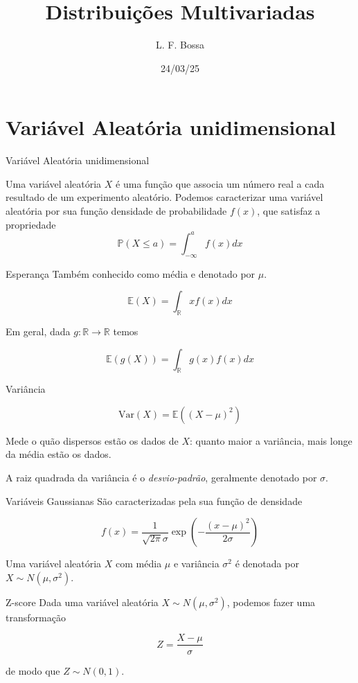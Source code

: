 \documentclass[
  ignorenonframetext,
  aspectratio=169,
]{beamer}
\title{Distribuições Multivariadas}
\author{L. F. Bossa}
\date{24/03/25}
\institute{UFSC}
\newcommand{\PP}{\mathbb{P}}
\newcommand{\RR}{\mathbb{R}}
\begin{document}
\frame{\titlepage}

\section{Variável Aleatória unidimensional}

\begin{frame}{Variável Aleatória unidimensional}

Uma variável aleatória $X$ é uma função que associa um número real a cada resultado de um experimento aleatório.
Podemos caracterizar uma variável aleatória por sua função densidade de probabilidade $f(x)$, que satisfaz a propriedade
\[\PP(X \le a) = \int_{-\infty}^{a} f(x) dx \] 
\end{frame}

\begin{frame}{Esperança}
Também conhecido como média e denotado por \(\mu\).

\[\mathbb{E}(X) = \int_{\RR} xf(x) dx\]
\end{frame}

\begin{frame}
Em geral, dada \(g: \RR\to \RR\) temos

\[\mathbb{E}(g(X)) = \int_{\RR} g(x)f(x) dx\]
\end{frame}

\begin{frame}{Variância}

\[\text{Var}(X) = \mathbb{E}( (X - \mu)^2)\]

Mede o quão dispersos estão os dados de \(X\): quanto maior a variância,
mais longe da média estão os dados.

A raiz quadrada da variância é o \emph{desvio-padrão}, geralmente denotado por
\(\sigma\).
\end{frame}

\begin{frame}{Variáveis Gaussianas}
São caracterizadas pela sua função de densidade

\[f(x) = \frac{1}{\sqrt{2\pi}\sigma}\exp\left(-\frac{(x-\mu)^2}{2\sigma}\right)\]

Uma variável aleatória \(X\) com média \(\mu\) e variância \(\sigma^2\)
é denotada por \(X\sim N(\mu,\sigma^2)\).
\end{frame}

\begin{frame}{Z-score}
Dada uma variável aleatória \(X\sim N(\mu,\sigma^2)\), podemos fazer uma
transformação

\[Z = \frac{X- \mu}{\sigma}\]

de modo que \(Z \sim  N(0,1)\).
\end{frame}
\end{document}
